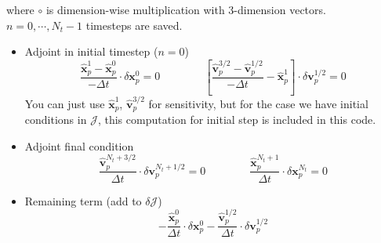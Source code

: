 \documentclass[11pt]{article}
\newcommand{\vp}{\mathbf{v}_p}
\newcommand{\xp}{\mathbf{x}_p}
\newcommand{\Dt}{\Delta t}
\newcommand{\vph}{\hat{\mathbf{v}}_p}
\newcommand{\xph}{\hat{\mathbf{x}}_p}
\newcommand{\cJ}{\mathcal{J}}
\begin{document}
where $\circ$ is dimension-wise multiplication with 3-dimension vectors.
$n=0,\cdots,N_t-1$ timesteps are saved.
\begin{itemize}
\item Adjoint in initial timestep ($n=0$)
\begin{equation}
\frac{\xph^1-\xph^0}{-\Dt}\cdot\delta \xp^0 = 0\qquad\qquad \left[ \frac{\vph^{3/2} - \vph^{1/2}}{-\Dt} - \xph^1 \right]\cdot\delta \vp^{1/2}=0
\end{equation}
You can just use $\xph^1$, $\vph^{3/2}$ for sensitivity,
but for the case we have initial conditions in $\cJ$, this computation for initial step is included in this code.
\item Adjoint final condition
\begin{equation}
\frac{\vph^{N_t+3/2}}{\Dt}\cdot\delta \vp^{N_t+1/2} = 0\qquad\qquad\frac{\xph^{N_t+1}}{\Dt}\cdot\delta \xp^{N_t} = 0
\end{equation}
\item Remaining term (add to $\delta \cJ$)
\begin{equation}
-\frac{\xph^0}{\Dt}\cdot\delta \xp^0 - \frac{\vph^{1/2}}{\Dt}\cdot\delta \vp^{1/2}
\end{equation}
\end{itemize}
\end{document}
